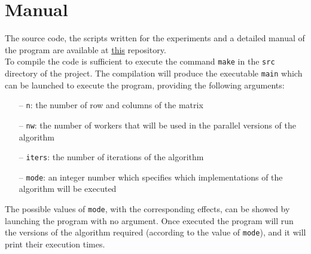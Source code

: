 \documentclass[12pt]{article}
\begin{document}
	\section{Manual}
	The source code, the scripts written for the experiments and a detailed manual of the program are available at \href{https://github.com/DiegoArcelli/Parallel-And-Distributed-Systems-Project}{this} repository.\\ 
	To compile the code is sufficient to execute the command \verb*|make| in the \verb*|src| directory of the project. The compilation will produce the executable \verb*|main| which can be launched to execute the program, providing the following arguments:
	\begin{itemize}
		\item[--] \verb|n|: the number of row and columns of the matrix
		\item[--] \verb|nw|: the number of workers that will be used in the parallel versions of the algorithm
		\item[--] \verb|iters|: the number of iterations of the algorithm
		\item[--] \verb|mode|: an integer number which specifies which implementations of the algorithm will be executed
	\end{itemize} 
	The possible values of \verb|mode|, with the corresponding effects, can be showed by launching the program with no argument. Once executed the program will run the versions of the algorithm required (according to the value of \verb|mode|), and it will print their execution times. 
	
\end{document}
